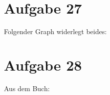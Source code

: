 \documentclass[10pt,a4paper]{article}
\begin{document}
\section*{Aufgabe 27}

    Folgender Graph widerlegt beides:
     \begin{figure}[!htb]
        \centering
    \end{figure}
    
\section*{Aufgabe 28}

Aus dem Buch:\\
\end{document}
